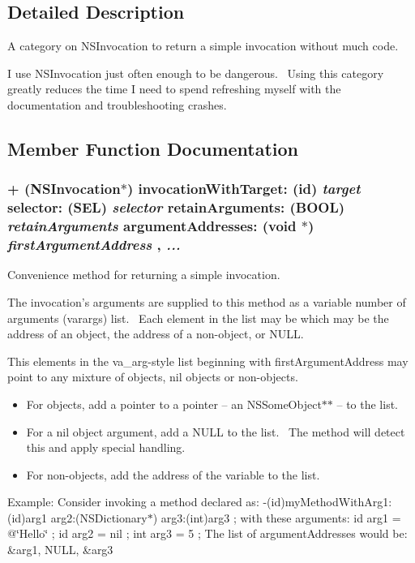 \subsection{Detailed Description}
A category on NSInvocation to return a simple invocation without much code. 

I use NSInvocation just often enough to be dangerous.~ Using this category greatly reduces the time I need to spend refreshing myself with the documentation and troubleshooting crashes. 

\subsection{Member Function Documentation}
\hypertarget{interface_n_s_invocation_07_quick_08_a9eac88859ea835ef6fb9590c9dd41ea}{
\subsubsection[{invocationWithTarget:selector:retainArguments:argumentAddresses:}]{\setlength{\rightskip}{0pt plus 5cm}+ (NSInvocation$\ast$) invocationWithTarget: (id) {\em target}\/ selector: (SEL) {\em selector}\/ retainArguments: (BOOL) {\em retainArguments}\/ argumentAddresses: (void $\ast$) {\em firstArgumentAddress}\/ ,  {\em ...}}}
\label{interface_n_s_invocation_07_quick_08_a9eac88859ea835ef6fb9590c9dd41ea}


Convenience method for returning a simple invocation. 

The invocation's arguments are supplied to this method as a variable number of arguments (varargs) list.~ Each element in the list may be which may be the address of an object, the address of a non-object, or NULL.

This elements in the va\_\-arg-style list beginning with firstArgumentAddress may point to any mixture of objects, nil objects or non-objects. \begin{itemize}
\item For objects, add a pointer to a pointer -- an NSSomeObject$\ast$$\ast$ -- to the list. \item For a nil object argument, add a NULL to the list.~ The method will detect this and apply special handling. \item For non-objects, add the address of the variable to the list. \end{itemize}
Example: Consider invoking a method declared as: -(id)myMethodWithArg1:(id)arg1 arg2:(NSDictionary$\ast$) arg3:(int)arg3 ; with these arguments: id arg1 = @\char`\"{}Hello\char`\"{} ; id arg2 = nil ; int arg3 = 5 ; The list of argumentAddresses would be:~ \&arg1, NULL, \&arg3

